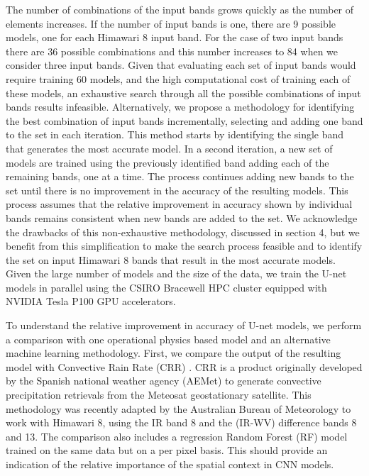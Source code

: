 \documentclass[3p,times]{elsarticle}
\begin{document}
The number of combinations of the input bands grows quickly as the number of elements increases. If the number of input bands is one, there are 9 possible models, one for each Himawari 8 input band. For the case of two input bands there are 36 possible combinations and this number increases to 84 when we consider three input bands. Given that evaluating each set of input bands would require training 60 models, and the high computational cost of training each of these models, an exhaustive search through all the possible combinations of input bands results infeasible. Alternatively, we propose a methodology for identifying the best combination of input bands incrementally, selecting and adding one band to the set in each iteration. This method starts by identifying the single band that generates the most accurate model. In a second iteration, a new set of models are trained using the previously identified band adding each of the remaining bands, one at a time. The process continues adding new bands to the set until there is no improvement in the accuracy of the resulting models. This process assumes that the relative improvement in accuracy shown by individual bands remains consistent when new bands are added to the set. We acknowledge the drawbacks of this non-exhaustive methodology, discussed in section 4, but we benefit from this simplification to make the search process feasible and to identify the set on input Himawari 8 bands that result in the most accurate models. Given the large number of models and the size of the data, we train the U-net models in parallel using the CSIRO Bracewell HPC cluster equipped with NVIDIA Tesla P100 GPU accelerators. 

To understand the relative improvement in accuracy of U-net models, we perform a comparison with one operational physics based model and an alternative machine learning methodology. First, we compare the output of the resulting model with Convective Rain Rate (CRR) \citep{aemetsaf2013}. CRR is a product originally developed by the Spanish national weather agency (AEMet) to generate convective precipitation retrievals from the Meteosat geostationary satellite. This methodology was recently adapted by the Australian Bureau of Meteorology to work with Himawari 8, using the IR band 8 and the (IR-WV) difference bands 8 and 13. The comparison also includes a regression Random Forest (RF) model \citep{breiman2001random} trained on the same data but on a per pixel basis. This should provide an indication of the relative importance of the spatial context in CNN models.
\end{document}
